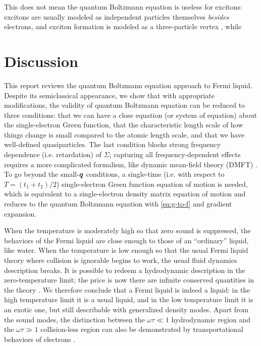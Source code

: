 \documentclass[hyperref, a4paper]{article}
\begin{document}
This does not mean the quantum Boltzmann equation is useless for excitons:
excitons are usually modeled as independent particles themselves
\emph{besides} electrons,
and exciton formation is modeled as 
a three-particle vertex \cite{klimontovich1981quantum},
while 


\section{Discussion}

This report reviews the quantum Boltzmann equation approach to Fermi liquid.
Despite its semiclassical appearance, 
we show that with appropriate modifications,
the validity of quantum Boltzmann equation 
can be reduced to three conditions:
that we can have a close equation (or system of equation) about 
the single-electron Green function,
that the characteristic length scale of how things change is 
small compared to the atomic length scale, 
and that we have well-defined quasiparticles.
The last condition blocks strong frequency dependence (i.e. retardation) of $\Sigma$;
capturing all frequency-dependent effects requires 
a more complicated formalism, 
like dynamic mean-field theory (DMFT) \cite{georges1996dynamical}.
To go beyond the small-$\vb*{q}$ conditions,
a single-time (i.e. with respect to $T = (t_1 + t_2) / 2$)
single-electron Green function equation of motion is needed,
which is equivalent to a single-electron density matrix equation of motion
\cite{attaccalite2011real}
and reduces to the quantum Boltzmann equation with \eqref{eq:g-to-f} 
and gradient expansion.

When the temperature is moderately high 
so that zero sound is suppressed,
the behaviors of the Fermi liquid 
are close enough to those of an ``ordinary'' liquid, like water.
When the temperature is low enough so that 
the usual Fermi liquid theory 
where collision is ignorable 
begins to work,
the usual fluid dynamics description breaks.
It is possible to redeem a hydrodynamic description in the zero-temperature limit;
the price is now there are infinite conserved quantities in the theory
\cite{Wen2007}. 
We therefore conclude that a Fermi liquid is indeed a liquid: 
in the high temperature limit it is a usual liquid,
and in the low temperature limit it is an exotic one,
but still describable with generalized density modes.
Apart from the sound modes,
the distinction between the $\omega \tau \ll 1$ hydrodynamic region
and the $\omega \tau \gg 1$ collision-less region 
can also be demonstrated by transportational behaviors of electrons
\cite{lucas2015hydrodynamic,lucas2018hydrodynamics,sulpizio2019visualizing}.

\printbibliography
\end{document}
